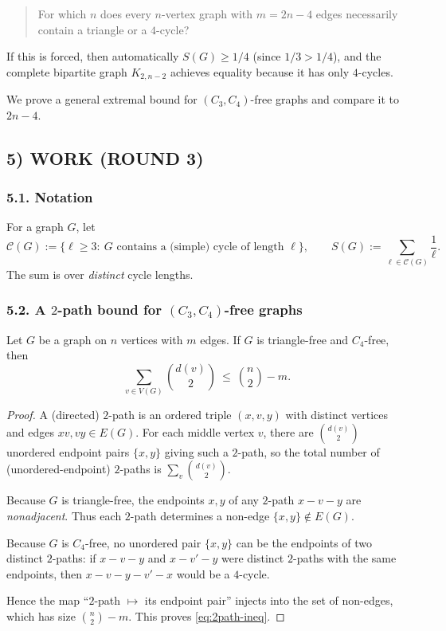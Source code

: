 \begin{quote}
For which $n$ does every $n$-vertex graph with $m=2n-4$ edges necessarily contain a triangle or a $4$-cycle?
\end{quote}

If this is forced, then automatically $S(G)\ge 1/4$ (since $1/3>1/4$), and the complete bipartite graph
$K_{2,n-2}$ achieves equality because it has only $4$-cycles.

We prove a general extremal bound for $(C_3,C_4)$-free graphs and compare it to $2n-4$.

\subsection{5) WORK (ROUND 3)}

\subsubsection*{5.1. Notation}
For a graph $G$, let
\[\mathcal C(G):=\{\ell\ge 3:\ G\text{ contains a (simple) cycle of length }\ell\},\qquad
S(G):=\sum_{\ell\in\mathcal C(G)}\frac1\ell.\]
The sum is over \emph{distinct} cycle lengths.

\subsubsection*{5.2. A $2$-path bound for $(C_3,C_4)$-free graphs}

\begin{lemma}\label{lem:2paths}
Let $G$ be a graph on $n$ vertices with $m$ edges. If $G$ is triangle-free and $C_4$-free, then
\begin{equation}\label{eq:2path-ineq}
\sum_{v\in V(G)}\binom{d(v)}{2}\ \le\ \binom{n}{2}-m.
\end{equation}
\end{lemma}

\begin{proof}
A (directed) $2$-path is an ordered triple $(x,v,y)$ with distinct vertices and edges $xv,vy\in E(G)$.
For each middle vertex $v$, there are $\binom{d(v)}{2}$ unordered endpoint pairs $\{x,y\}$ giving such a $2$-path,
so the total number of (unordered-endpoint) $2$-paths is $\sum_v \binom{d(v)}{2}$.

Because $G$ is triangle-free, the endpoints $x,y$ of any $2$-path $x-v-y$ are \emph{nonadjacent}.
Thus each $2$-path determines a non-edge $\{x,y\}\notin E(G)$.

Because $G$ is $C_4$-free, no unordered pair $\{x,y\}$ can be the endpoints of two distinct $2$-paths:
if $x-v-y$ and $x-v'-y$ were distinct $2$-paths with the same endpoints, then
$x-v-y-v'-x$ would be a $4$-cycle.

Hence the map ``$2$-path $\mapsto$ its endpoint pair'' injects into the set of non-edges,
which has size $\binom{n}{2}-m$. This proves \eqref{eq:2path-ineq}.
\end{proof}


